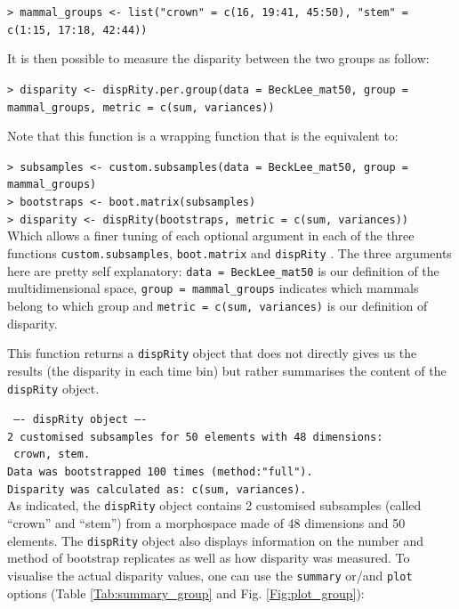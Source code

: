 \documentclass[12pt,letterpaper]{article}
\newcommand{\disp}{\texttt{dispRity} }
\begin{document}
\texttt{> mammal\_groups <- list("crown" = c(16, 19:41, 45:50), "stem" = c(1:15, 17:18, 42:44))}

\noindent It is then possible to measure the disparity between the two groups as follow:

\texttt{> disparity <- dispRity.per.group(data = BeckLee\_mat50, group = mammal\_groups, metric = c(sum, variances))}

\noindent Note that this function is a wrapping function that is the equivalent to:

\texttt{> subsamples <- custom.subsamples(data = BeckLee\_mat50, group = mammal\_groups)}\\
\texttt{> bootstraps <- boot.matrix(subsamples)}\\
\texttt{> disparity <- dispRity(bootstraps, metric = c(sum, variances))}\\


\noindent Which allows a finer tuning of each optional argument in each of the three functions \texttt{custom.subsamples}, \texttt{boot.matrix} and \disp.
The three arguments here are pretty self explanatory: \texttt{data = BeckLee\_mat50} is our definition of the multidimensional space, \texttt{group = mammal\_groups} indicates which mammals belong to which group and \texttt{metric = c(sum, variances)} is our definition of disparity. 

This function returns a \disp object that does not directly gives us the results (the disparity in each time bin) but rather summarises the content of the \disp object.

\noindent \texttt{ ---- dispRity object ---- }\\
\noindent \texttt{2 customised subsamples for 50 elements with 48 dimensions:}\\
\noindent \texttt{    crown, stem.}\\
\noindent \texttt{Data was bootstrapped 100 times (method:"full").}\\
\noindent \texttt{Disparity was calculated as: c(sum, variances).}\\

\bigskip
As indicated, the \disp object contains 2 customised subsamples (called ``crown'' and ``stem'') from a morphospace made of 48 dimensions and 50 elements.
The \disp object also displays information on the number and method of bootstrap replicates as well as how disparity was measured.
To visualise the actual disparity values, one can use the \texttt{summary} or/and \texttt{plot} options (Table \ref{Tab:summary_group} and Fig. \ref{Fig:plot_group}):
\end{document}
